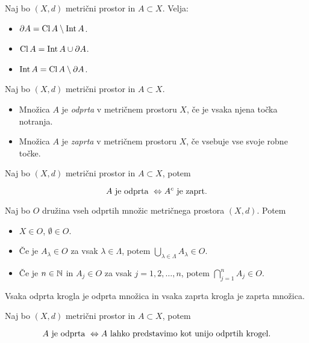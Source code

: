 \begin{trditev}
    Naj bo $(X, d)$ metrični prostor in $A \subset X$. Velja:
    \begin{itemize}
        \item $\partial A = \operatorname{Cl} A \setminus \operatorname{Int} A$.
        \item $\operatorname{Cl} A = \operatorname{Int} A \cup \partial A$.
        \item $\operatorname{Int} A = \operatorname{Cl} A \setminus \partial A$.
    \end{itemize}
\end{trditev}

\begin{definicija}    
    Naj bo $(X, d)$ metrični prostor in $A \subset X$.
    \begin{itemize}
        \item Množica $A$ je \emph{odprta} v metričnem prostoru $X$, če je vsaka njena točka notranja.
        \item Množica $A$ je \emph{zaprta} v metričnem prostoru $X$, če vsebuje vse svoje robne točke.
    \end{itemize}
\end{definicija}

\begin{trditev}
    Naj bo $(X, d)$ metrični prostor in $A \subset X$, potem 

    $$A \text{ je odprta } \Leftrightarrow A^c \text{ je zaprt}.$$
\end{trditev}

\begin{izrek}
    Naj bo $O$ družina vseh odprtih množic metričnega prostora $(X, d)$. Potem
    \begin{itemize}
        \item $X \in O$, $\emptyset \in O$.
        \item Če je $A_\lambda \in O$ za vsak $\lambda \in \Lambda$, potem $ \bigcup_{\lambda \in \Lambda} A_\lambda \in O$.
        \item Če je $n \in \mathbb{N}$ in $A_j \in O$ za vsak $j = 1, 2, \ldots, n$, potem $ \bigcap_{j=1}^n A_j \in O$.
    \end{itemize}
\end{izrek}

\begin{trditev}
    Vsaka odprta krogla je odprta množica in vsaka zaprta krogla je zaprta množica.
\end{trditev}

\begin{trditev}
    Naj bo $(X, d)$ metrični prostor in $A \subset X$, potem 

    $$A \text{ je odprta } \Leftrightarrow A \text{ lahko predstavimo kot unijo odprtih krogel}.$$
\end{trditev}

